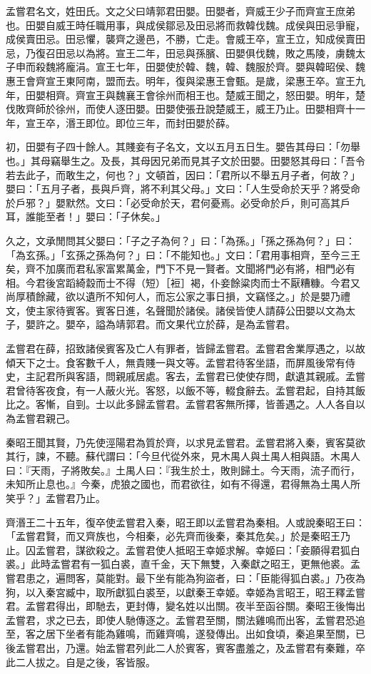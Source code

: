 
\begin{pinyinscope}
孟嘗君名文，姓田氏。文之父曰靖郭君田嬰。田嬰者，齊威王少子而齊宣王庶弟也。田嬰自威王時任職用事，與成侯鄒忌及田忌將而救韓伐魏。成侯與田忌爭寵，成侯賣田忌。田忌懼，襲齊之邊邑，不勝，亡走。會威王卒，宣王立，知成侯賣田忌，乃復召田忌以為將。宣王二年，田忌與孫臏、田嬰俱伐魏，敗之馬陵，虜魏太子申而殺魏將龐涓。宣王七年，田嬰使於韓、魏，韓、魏服於齊。嬰與韓昭侯、魏惠王會齊宣王東阿南，盟而去。明年，復與梁惠王會甄。是歲，梁惠王卒。宣王九年，田嬰相齊。齊宣王與魏襄王會徐州而相王也。楚威王聞之，怒田嬰。明年，楚伐敗齊師於徐州，而使人逐田嬰。田嬰使張丑說楚威王，威王乃止。田嬰相齊十一年，宣王卒，湣王即位。即位三年，而封田嬰於薛。

初，田嬰有子四十餘人。其賤妾有子名文，文以五月五日生。嬰告其母曰：「勿舉也。」其母竊舉生之。及長，其母因兄弟而見其子文於田嬰。田嬰怒其母曰：「吾令若去此子，而敢生之，何也？」文頓首，因曰：「君所以不舉五月子者，何故？」嬰曰：「五月子者，長與戶齊，將不利其父母。」文曰：「人生受命於天乎？將受命於戶邪？」嬰默然。文曰：「必受命於天，君何憂焉。必受命於戶，則可高其戶耳，誰能至者！」嬰曰：「子休矣。」

久之，文承閒問其父嬰曰：「子之子為何？」曰：「為孫。」「孫之孫為何？」曰：「為玄孫。」「玄孫之孫為何？」曰：「不能知也。」文曰：「君用事相齊，至今三王矣，齊不加廣而君私家富累萬金，門下不見一賢者。文聞將門必有將，相門必有相。今君後宮蹈綺縠而士不得（短）［裋］褐，仆妾餘粱肉而士不厭糟糠。今君又尚厚積餘藏，欲以遺所不知何人，而忘公家之事日損，文竊怪之。」於是嬰乃禮文，使主家待賓客。賓客日進，名聲聞於諸侯。諸侯皆使人請薛公田嬰以文為太子，嬰許之。嬰卒，謚為靖郭君。而文果代立於薛，是為孟嘗君。

孟嘗君在薛，招致諸侯賓客及亡人有罪者，皆歸孟嘗君。孟嘗君舍業厚遇之，以故傾天下之士。食客數千人，無貴賤一與文等。孟嘗君待客坐語，而屏風後常有侍史，主記君所與客語，問親戚居處。客去，孟嘗君已使使存問，獻遺其親戚。孟嘗君曾待客夜食，有一人蔽火光。客怒，以飯不等，輟食辭去。孟嘗君起，自持其飯比之。客慚，自剄。士以此多歸孟嘗君。孟嘗君客無所擇，皆善遇之。人人各自以為孟嘗君親己。

秦昭王聞其賢，乃先使涇陽君為質於齊，以求見孟嘗君。孟嘗君將入秦，賓客莫欲其行，諫，不聽。蘇代謂曰：「今旦代從外來，見木禺人與土禺人相與語。木禺人曰：『天雨，子將敗矣。』土禺人曰：『我生於土，敗則歸土。今天雨，流子而行，未知所止息也。』今秦，虎狼之國也，而君欲往，如有不得還，君得無為土禺人所笑乎？」孟嘗君乃止。

齊湣王二十五年，復卒使孟嘗君入秦，昭王即以孟嘗君為秦相。人或說秦昭王曰：「孟嘗君賢，而又齊族也，今相秦，必先齊而後秦，秦其危矣。」於是秦昭王乃止。囚孟嘗君，謀欲殺之。孟嘗君使人抵昭王幸姬求解。幸姬曰：「妾願得君狐白裘。」此時孟嘗君有一狐白裘，直千金，天下無雙，入秦獻之昭王，更無他裘。孟嘗君患之，遍問客，莫能對。最下坐有能為狗盜者，曰：「臣能得狐白裘。」乃夜為狗，以入秦宮臧中，取所獻狐白裘至，以獻秦王幸姬。幸姬為言昭王，昭王釋孟嘗君。孟嘗君得出，即馳去，更封傳，變名姓以出關。夜半至函谷關。秦昭王後悔出孟嘗君，求之已去，即使人馳傳逐之。孟嘗君至關，關法雞鳴而出客，孟嘗君恐追至，客之居下坐者有能為雞鳴，而雞齊鳴，遂發傳出。出如食頃，秦追果至關，已後孟嘗君出，乃還。始孟嘗君列此二人於賓客，賓客盡羞之，及孟嘗君有秦難，卒此二人拔之。自是之後，客皆服。


\end{pinyinscope}
